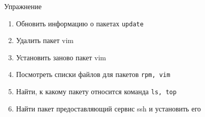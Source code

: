 \begin{frame}[fragile]{Упражнение}
  \begin{enumerate}
      \item Обновить информацию о пакетах {\tt update}
      \item Удалить пакет vim
      \item Установить заново пакет vim
      \item Посмотреть списки файлов для пакетов {\tt rpm, vim}
      \item Найти, к какому пакету относится команда {\tt ls, top}
      \item Найти пакет предоставляющий сервис ssh и установить его
    \end{enumerate}
\end{frame}

